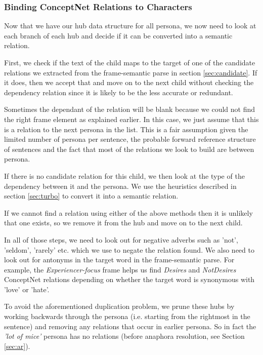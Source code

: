\subsubsection{Binding ConceptNet Relations to Characters}
	
Now that we have our hub data structure for all persona, we now need to look at each branch of each hub and decide if it can be converted into a semantic relation.

First, we check if the text of the child maps to the target of one of the candidate relations we extracted from the frame-semantic parse in section \ref{sec:candidate}. If it does, then we accept that and move on to the next child without checking the dependency relation since it is likely to be the less accurate or redundant. 

Sometimes the dependant of the relation will be blank because we could not find the right frame element as explained earlier. In this case, we just assume that this is a relation to the next persona in the list. This is a fair assumption given the limited number of persona per sentence, the probable forward reference structure of sentences and the fact that most of the relations we look to build are between persona.

If there is no candidate relation for this child, we then look at the type of the dependency between it and the persona. We use the heuristics described in section \ref{sec:turbo} to convert it into a semantic relation.

If we cannot find a relation using either of the above methods then it is unlikely that one exists, so we remove it from the hub and move on to the next child.

In all of those steps, we need to look out for negative adverbs such as 'not', 'seldom', 'rarely' etc. which we use to negate the relation found. We also need to look out for antonyms in the target word in the frame-semantic parse. For example, the \textit{Experiencer-focus} frame helps us find \textit{Desires} and \textit{NotDesires} ConceptNet relations depending on whether the target word is synonymous with 'love' or 'hate'.

To avoid the aforementioned duplication problem, we prune these hubs by working backwards through the persona (i.e. starting from the rightmost in the sentence) and removing any relations that occur in earlier persona. So in fact the \textit{'lot of mice'} persona has no relations (before anaphora resolution, see Section \ref{sec:ar}).

